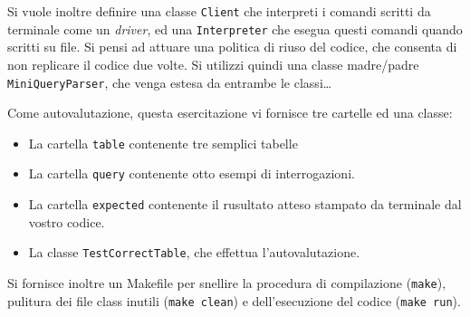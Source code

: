 \documentclass[]{scrartcl}
\begin{document}
Si vuole inoltre definire una classe \texttt{Client} che interpreti i comandi scritti da terminale come un \textit{driver}, ed una \texttt{Interpreter} che esegua questi comandi quando scritti su file. Si pensi ad attuare una politica di riuso del codice, che consenta di non replicare il codice due volte. Si utilizzi quindi una classe madre/padre \texttt{MiniQueryParser}, che venga estesa da entrambe le classi\dots
\bigskip

Come autovalutazione, questa esercitazione vi fornisce tre cartelle ed una classe:
\begin{itemize}
\item La cartella \texttt{table} contenente tre semplici tabelle
\item La cartella \texttt{query} contenente otto esempi di interrogazioni.
\item La cartella \texttt{expected} contenente il rusultato atteso stampato da terminale dal vostro codice.
\item La classe \texttt{TestCorrectTable}, che effettua l'autovalutazione.
\end{itemize}
Si fornisce inoltre un Makefile per snellire la procedura di compilazione (\texttt{make}), pulitura dei file class inutili (\texttt{make clean}) e dell'esecuzione del codice (\texttt{make run}).
\end{document}
